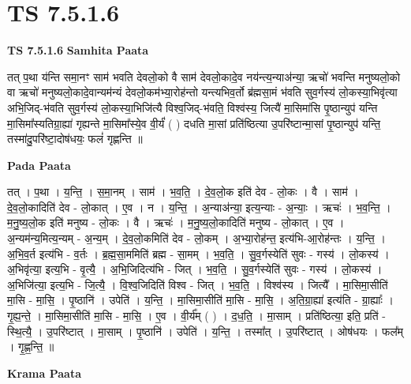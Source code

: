 \documentclass[17pt]{extarticle}
\begin{document}
\section{ TS 7.5.1.6 }

\textbf{TS 7.5.1.6 } \newline
\textbf{Samhita Paata} \newline

तत् प॒था य॑न्ति समा॒नꣳ साम॑ भवति देवलो॒को वै साम॑ देवलो॒कादे॒व नय॑न्त्य॒न्याअ॑न्या॒ ऋचो॑ भवन्ति मनुष्यलो॒को वा ऋचो॑ मनुष्यलो॒कादे॒वान्यम॑न्यं देवलो॒कम॑भ्या॒रोह॑न्तो यन्त्यभिव॒र्तो ब्र॑ह्मसा॒मं भ॑वति सुव॒र्गस्य॑ लो॒कस्या॒भिवृ॑त्या अभि॒जिद्-भ॑वति सुव॒र्गस्य॑ लो॒कस्या॒भिजि॑त्यै विश्व॒जिद्-भ॑वति॒ विश्व॑स्य॒ जित्यै॑ मा॒सिमा॑सि पृ॒ष्ठान्युप॑ यन्ति मा॒सिमा᳚स्यतिग्रा॒ह्या॑ गृह्यन्ते मा॒सिमा᳚स्ये॒व वी॒र्यं॑ ( ) दधति मा॒सां प्रति॑ष्ठित्या उ॒परि॑ष्टान्मा॒सां पृ॒ष्ठान्युप॑ यन्ति॒ तस्मा॑दु॒परि॑ष्टा॒दोष॑धयः॒ फलं॑ गृह्णन्ति ॥ \newline

\textbf{Pada Paata} \newline

तत् । प॒था । य॒न्ति॒ । स॒मा॒नम् । साम॑ । भ॒व॒ति॒ । दे॒व॒लो॒क इति॑ देव - लो॒कः । वै । साम॑ । दे॒व॒लो॒कादिति॑ देव - लो॒कात् । ए॒व । न । य॒न्ति॒ । अ॒न्या‌अ॑न्या॒ इत्य॒न्याः - अ॒न्याः॒ । ऋचः॑ । भ॒व॒न्ति॒ । म॒नु॒ष्य॒लो॒क इति॑ मनुष्य - लो॒कः । वै । ऋचः॑ । म॒नु॒ष्य॒लो॒कादिति॑ मनुष्य - लो॒कात् । ए॒व । अ॒न्यम॑न्य॒मित्य॒न्यम् - अ॒न्य॒म् । दे॒व॒लो॒कमिति॑ देव - लो॒कम् । अ॒भ्या॒रोह॑न्त॒ इत्य॑भि-आ॒रोह॑न्तः । य॒न्ति॒ । अ॒भि॒व॒र्त इत्य॑भि  -  व॒र्तः । ब्र॒ह्म॒सा॒ममिति॑ ब्रह्म - सा॒मम् । भ॒व॒ति॒ । सु॒व॒र्गस्येति॑ सुवः - गस्य॑ । लो॒कस्य॑ । अ॒भिवृ॑त्या॒ इत्य॒भि - वृ॒त्यै॒ । अ॒भि॒जिदित्य॑भि - जित् । भ॒व॒ति॒ । सु॒व॒र्गस्येति॑ सुवः - गस्य॑ । लो॒कस्य॑ । अ॒भिजि॑त्या॒ इत्य॒भि - जि॒त्यै॒ । वि॒श्व॒जिदिति॑ विश्व - जित् । भ॒व॒ति॒ । विश्व॑स्य । जित्यै᳚ । मा॒सिमा॒सीति॑ मा॒सि - मा॒सि॒ । पृ॒ष्ठानि॑ । उपेति॑ । य॒न्ति॒ । मा॒सिमा॒सीति॑ मा॒सि - मा॒सि॒ । अ॒ति॒ग्रा॒ह्या॑ इत्य॑ति - ग्रा॒ह्याः᳚ । गृ॒ह्य॒न्ते॒ । मा॒सिमा॒सीति॑ मा॒सि - मा॒सि॒ । ए॒व । वी॒र्य᳚म् ( ) । द॒ध॒ति॒ । मा॒साम् । प्रति॑ष्ठित्या॒ इति॒ प्रति॑ - स्थि॒त्यै॒ । उ॒परि॑ष्टात् । मा॒साम् । पृ॒ष्ठानि॑ । उपेति॑ । य॒न्ति॒ । तस्मा᳚त् । उ॒परि॑ष्टात् । ओष॑धयः । फल᳚म् । गृ॒ह्ण॒न्ति॒ ॥  \newline


\textbf{Krama Paata} \newline
\end{document}
